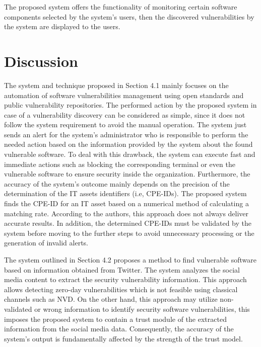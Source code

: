 \documentclass{llncs}
\begin{document}
The proposed system offers the functionality of monitoring certain software components selected by the system's users, then the discovered vulnerabilities by the system are displayed to the users.

\section{Discussion}

\par The system and technique proposed in Section 4.1 mainly focuses on the automation of software vulnerabilities management using open standards and public vulnerability repositories. The performed action by the proposed system in case of a vulnerability discovery can be considered as simple, since it does not follow the system requirement to avoid the manual operation. The system just sends an alert for the system's administrator who is responsible to perform the needed action based on the information provided by the system about the found vulnerable software. To deal with this drawback, the system can execute fast and immediate actions such as  blocking the corresponding terminal or even the vulnerable software  to ensure security inside the organization. Furthermore, the accuracy of the system's outcome mainly depends on the precision of the determination of the IT assets identifiers (i.e, CPE-IDs). The proposed system finds the CPE-ID for an IT asset based on a numerical method of calculating a matching rate. According to the authors, this approach does not always deliver accurate results. In addition, the determined CPE-IDs must be validated by the system before moving to the further steps to avoid unnecessary processing or the generation of invalid alerts.


\par The system outlined in Section 4.2 proposes a method to find vulnerable software based on information obtained from Twitter. The system analyzes the social media content to extract the security vulnerability information. This approach allows detecting zero-day vulnerabilities which is not feasible using classical channels such as NVD. On the other hand, this approach may utilize non- validated or wrong information to  identify security software vulnerabilities, this imposes the proposed system to contain a trust module of the extracted information from the social media data. Consequently, the accuracy of the system's output is  fundamentally affected by the strength of the trust model.
   
\end{document}
